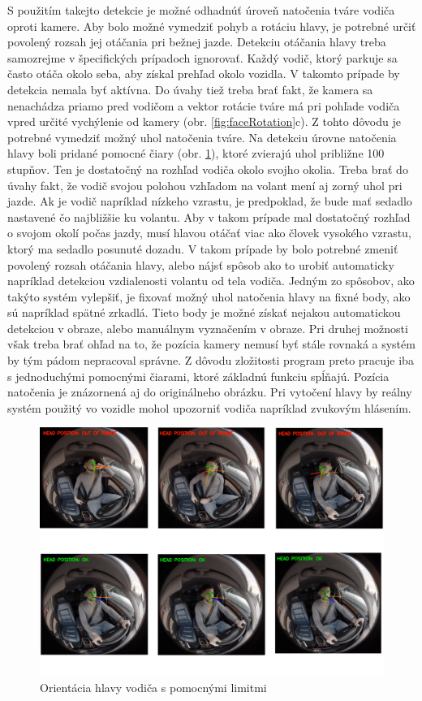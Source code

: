 \documentclass[slovak,master,dept460,male,cpp,cpdeclaration]{diploma}
\begin{document}
S použitím takejto detekcie je možné odhadnúť úroveň natočenia tváre vodiča oproti kamere. Aby bolo možné vymedziť pohyb a rotáciu hlavy, je potrebné určiť povolený rozsah jej otáčania pri bežnej jazde. Detekciu otáčania hlavy treba  samozrejme v špecifických prípadoch ignorovať. Každý vodič, ktorý parkuje sa často otáča okolo seba, aby získal prehľad okolo vozidla. V takomto prípade  by detekcia  nemala byť aktívna. Do úvahy tiež treba brať fakt, že kamera sa nenachádza priamo pred vodičom a vektor rotácie tváre má  pri pohľade vodiča vpred určité vychýlenie od kamery (obr. \ref{fig:faceRotation}c). Z tohto dôvodu je potrebné  vymedziť  možný uhol natočenia tváre. Na detekciu úrovne natočenia hlavy boli pridané  pomocné čiary (obr. \ref{fig:headLimits}), ktoré zvierajú uhol približne 100 stupňov. Ten je dostatočný na rozhľad vodiča okolo svojho okolia. Treba brať do úvahy fakt, že vodič svojou polohou vzhľadom na volant mení aj zorný uhol pri jazde. Ak je vodič napríklad nízkeho vzrastu, je predpoklad, že bude mať sedadlo nastavené čo najbližšie ku volantu. Aby v takom prípade mal dostatočný rozhľad o svojom okolí počas jazdy, musí hlavou otáčať viac ako človek vysokého vzrastu, ktorý ma sedadlo posunuté dozadu. V takom prípade by bolo potrebné zmeniť povolený rozsah otáčania hlavy, alebo nájsť spôsob ako to urobiť automaticky napríklad detekciou vzdialenosti volantu od tela vodiča. Jedným zo spôsobov, ako takýto systém vylepšiť, je fixovať možný uhol natočenia hlavy na fixné body, ako sú napríklad spätné zrkadlá. Tieto body je možné získať nejakou automatickou detekciou v obraze, alebo manuálnym vyznačením v obraze. Pri druhej možnosti však treba brať ohľad na to, že pozícia kamery nemusí byť stále rovnaká a systém by tým pádom nepracoval správne. Z dôvodu zložitosti program preto pracuje iba s jednoduchými pomocnými čiarami, ktoré základnú funkciu  spĺňajú.  Pozícia natočenia  je znázornená aj do originálneho obrázku. Pri vytočení hlavy by reálny systém použitý vo vozidle mohol upozorniť vodiča napríklad zvukovým hlásením.

\begin{figure}[H]
	\centering
	\includegraphics[width=1\textwidth]{Figures/headLimits1.png}
	\caption{Orientácia hlavy vodiča s pomocnými limitmi}
	\label{fig:headLimits}
\end{figure}
\end{document}
